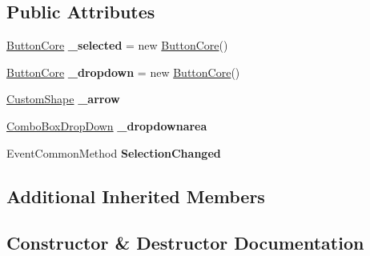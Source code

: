\subsection*{Public Attributes}
\begin{DoxyCompactItemize}
\item 
\mbox{\label{class_space_v_i_l_1_1_combo_box_adce23de67d14548e8ae0b9785396c562}} 
\mbox{\hyperlink{class_space_v_i_l_1_1_button_core}{Button\+Core}} {\bfseries \+\_\+selected} = new \mbox{\hyperlink{class_space_v_i_l_1_1_button_core}{Button\+Core}}()
\item 
\mbox{\label{class_space_v_i_l_1_1_combo_box_af5f8b3c7272b4db8b4cbd95dcd6120a5}} 
\mbox{\hyperlink{class_space_v_i_l_1_1_button_core}{Button\+Core}} {\bfseries \+\_\+dropdown} = new \mbox{\hyperlink{class_space_v_i_l_1_1_button_core}{Button\+Core}}()
\item 
\mbox{\label{class_space_v_i_l_1_1_combo_box_a2c1391f8845896c3f5299c8e0f8d6586}} 
\mbox{\hyperlink{class_space_v_i_l_1_1_custom_shape}{Custom\+Shape}} {\bfseries \+\_\+arrow}
\item 
\mbox{\label{class_space_v_i_l_1_1_combo_box_a2d664a0828b5fd443165f0d717cd042f}} 
\mbox{\hyperlink{class_space_v_i_l_1_1_combo_box_drop_down}{Combo\+Box\+Drop\+Down}} {\bfseries \+\_\+dropdownarea}
\item 
\mbox{\label{class_space_v_i_l_1_1_combo_box_a157ec5951015e44b3eca71faba5ad8f3}} 
Event\+Common\+Method {\bfseries Selection\+Changed}
\end{DoxyCompactItemize}
\subsection*{Additional Inherited Members}


\subsection{Constructor \& Destructor Documentation}
\mbox{\label{class_space_v_i_l_1_1_combo_box_a5d981f81824ff870fa91043c93394f68}} 
